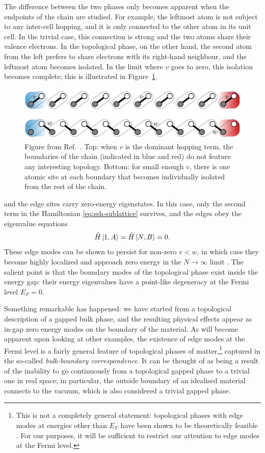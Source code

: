 The difference between the two phases only becomes apparent when the endpoints of the chain are studied. For example, the leftmost atom is not subject to any inter-cell hopping, and it is only connected to the other atom in its unit cell. In the trivial case, this connection is strong and the two atoms share their valence electrons. In the topological phase, on the other hand, the second atom from the left prefers to share electrons with its right-hand neighbour, and the leftmost atom becomes isolated. In the limit where $v$ goes to zero, this isolation becomes complete; this is illustrated in Figure~\ref{fig:SSH-boundaries}.
\begin{figure}[htb!]
	\centering
	\includegraphics[width=0.8\linewidth]{Images/SSH-boundaries}
	\caption{Figure from Ref.~\cite{Asboth_topo-course}. Top: when $v$ is the dominant hopping term, the boundaries of the chain (indicated in blue and red) do not feature any interesting topology. Bottom: for small enough $v$, there is one atomic site at each boundary that becomes individually isolated from the rest of the chain.}
	\label{fig:SSH-boundaries}
\end{figure}
and the edge sites carry zero-energy eigenstates. In this case, only the second term in the Hamiltonian \eqref{eq:ssh-sublattice} survives, and the edges obey the eigenvalue equations
\begin{align*}
	\hat{H}\ket{1,A} = \hat{H}\ket{N,B} = 0.
\end{align*}
These edge modes can be shown to persist for non-zero $v<w$, in which case they become highly localized and approach zero energy in the $N\to\infty$ limit \cite{Asboth_topo-course}. The salient point is that the boundary modes of the topological phase exist inside the energy gap: their energy eigenvalues have a point-like degeneracy at the Fermi level $E_F = 0$. 

Something remarkable has happened: we have started from a topological description of a gapped bulk phase, and the resulting physical effects appear as in-gap zero energy modes on the boundary of the material. As will become apparent upon looking at other examples, the existence of edge modes at the Fermi level is a fairly general feature of topological phases of matter,\footnote{
	This is not a completely general statement: topological phases with edge modes at energies other than $E_F$ have been shown to be theoretically feasible \cite{Freedman_gapped-edge}. For our purposes, it will be sufficient to restrict our attention to edge modes at the Fermi level.}
captured in the so-called \emph{bulk-boundary correspondence}. It can be thought of as being a result of the inability to go continuously from a topological gapped phase to a trivial one in real space; in particular, the outside boundary of an idealised material connects to the vacuum, which is also considered a trivial gapped phase.

